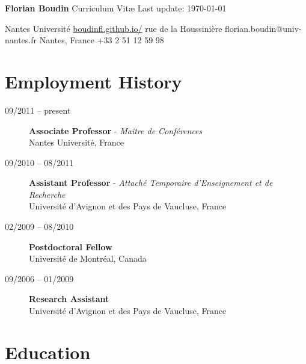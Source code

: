 \documentclass[11pt,a4paper]{article}
\begin{document}
{\Large 
    \textbf{Florian Boudin} \quad Curriculum Vit\ae{}
}
\hfill
{\small
    Last update: \today
}

\vspace*{1em}

Nantes Université \hfill \href{https://boudinfl.github.io/}{boudinfl.github.io/}  rue de la Houssinière \hfill florian.boudin@univ-nantes.fr  Nantes, France \hfill  +33 2 51 12 59 98

\section*{Employment History}

\begin{description}

    \item[09/2011 -- present]  \textbf{Associate Professor} - \emph{Maître de Conférences} \\
                                Nantes Université, France

    \item[09/2010 -- 08/2011] \textbf{Assistant Professor} - \emph{Attaché Temporaire d'Enseignement et de Recherche} \\
                               Université d'Avignon et des Pays de Vaucluse, France

    \item[02/2009 -- 08/2010] \textbf{Postdoctoral Fellow} \\
                               Université de Montréal, Canada

    \item[09/2006 -- 01/2009] \textbf{Research Assistant} \\
                              Université d'Avignon et des Pays de Vaucluse, France

\end{description}

\section*{Education}
\end{document}
